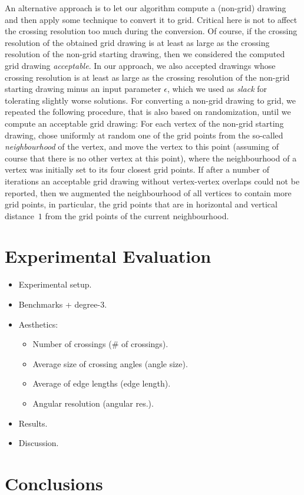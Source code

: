 \documentclass[runningheads]{llncs}
\begin{document}
An alternative approach is to let our algorithm compute a (non-grid) drawing and then apply some technique to convert it to grid. Critical here is not to affect the crossing resolution too much during the conversion. Of course, if the crossing resolution of the obtained grid drawing is at least as large as the crossing resolution of the non-grid starting drawing, then we considered the computed grid drawing \emph{acceptable}. In our approach, we also accepted drawings whose crossing resolution is at least as large as the crossing resolution of the non-grid starting drawing minus an input parameter $\epsilon$, which we used as \emph{slack} for tolerating slightly worse solutions. For converting a non-grid drawing to grid, we repeated the following procedure, that is also based on randomization, until we compute an acceptable grid drawing: For each vertex of the non-grid starting drawing, chose uniformly at random one of the grid points from the so-called \emph{neighbourhood} of the vertex, and move the vertex to this point (assuming of course that there is no other vertex at this point), where the neighbourhood of a vertex was initially set to its four closest grid points. If after a number of iterations an acceptable grid drawing without vertex-vertex overlaps could not be reported, then we augmented the neighbourhood of all vertices to contain more grid points, in particular, the grid points that are in horizontal and vertical distance~$1$ from the grid points of the current neighbourhood. 


\section{Experimental Evaluation}
\label{sec:experiments}

\begin{itemize}
\item Experimental setup.
\item Benchmarks + degree-3.
\item Aesthetics:

\begin{itemize}
\item Number of crossings (\# of crossings).
\item Average size of crossing angles (angle size).
\item Average of edge lengths (edge length).
\item Angular resolution (angular res.).
\end{itemize}

\item Results.
\item Discussion.
\end{itemize}

\section{Conclusions}
\label{sec:conclusions}



\end{document}
